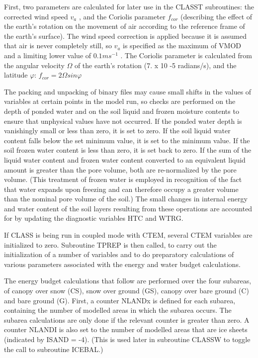 First, two parameters are calculated for later use in the C\+L\+A\+S\+S\+T subroutines\+: the corrected wind speed $v_a$ , and the Coriolis parameter $f_{cor}$ (describing the effect of the earth’s rotation on the movement of air according to the reference frame of the earth’s surface). The wind speed correction is applied because it is assumed that air is never completely still, so $v_a$ is specified as the maximum of V\+M\+O\+D and a limiting lower value of $0.1 m s^{-1}$ . The Coriolis parameter is calculated from the angular velocity $\Omega$ of the earth’s rotation (7. x 10 -\/5 radians/s), and the latitude $\varphi$\+: $f_{cor} = 2 \Omega sin \varphi$

The packing and unpacking of binary files may cause small shifts in the values of variables at certain points in the model run, so checks are performed on the depth of ponded water and on the soil liquid and frozen moisture contents to ensure that unphysical values have not occurred. If the ponded water depth is vanishingly small or less than zero, it is set to zero. If the soil liquid water content falls below the set minimum value, it is set to the minimum value. If the soil frozen water content is less than zero, it is set back to zero. If the sum of the liquid water content and frozen water content converted to an equivalent liquid amount is greater than the pore volume, both are re-\/normalized by the pore volume. (This treatment of frozen water is employed in recognition of the fact that water expands upon freezing and can therefore occupy a greater volume than the nominal pore volume of the soil.) The small changes in internal energy and water content of the soil layers resulting from these operations are accounted for by updating the diagnostic variables H\+T\+C and W\+T\+R\+G.

If C\+L\+A\+S\+S is being run in coupled mode with C\+T\+E\+M, several C\+T\+E\+M variables are initialized to zero. Subroutine T\+P\+R\+E\+P is then called, to carry out the initialization of a number of variables and to do preparatory calculations of various parameters associated with the energy and water budget calculations.

The energy budget calculations that follow are performed over the four subareas, of canopy over snow (C\+S), snow over ground (G\+S), canopy over bare ground (C) and bare ground (G). First, a counter N\+L\+A\+N\+Dx is defined for each subarea, containing the number of modelled areas in which the subarea occurs. The subarea calculations are only done if the relevant counter is greater than zero. A counter N\+L\+A\+N\+D\+I is also set to the number of modelled areas that are ice sheets (indicated by I\+S\+A\+N\+D = -\/4). (This is used later in subroutine C\+L\+A\+S\+S\+W to toggle the call to subroutine I\+C\+E\+B\+A\+L.)

